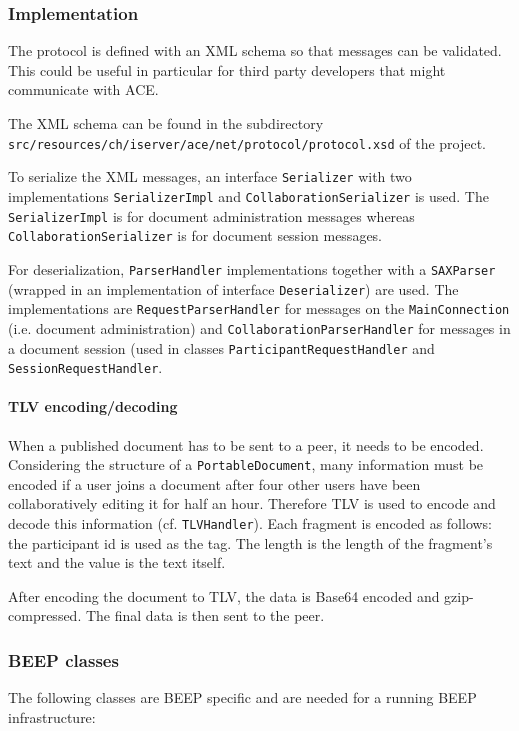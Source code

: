 \subsubsection{Implementation}
The protocol is defined with an XML schema so that messages can be validated. This could be useful in particular for third party developers that might communicate with ACE.

The XML schema can be found in the subdirectory \texttt{src/\-resources/\-ch/\-iserver/\-ace/\-net/\-protocol/\-protocol.xsd} of the project.

To serialize the XML messages, an interface \texttt{Serializer} with two implementations \texttt{SerializerImpl} and \texttt{CollaborationSerializer} is used. The \texttt{SerializerImpl} is for document administration messages whereas \texttt{CollaborationSerializer} is for document session messages.

For deserialization, \texttt{ParserHandler} implementations together with a \texttt{SAXParser} (wrapped in an implementation of interface \texttt{Deserializer}) are used. The implementations are \texttt{RequestParserHandler} for messages on the \texttt{MainConnection} (i.e. document administration) and \texttt{CollaborationParserHandler} for messages in a document session (used in classes \texttt{ParticipantRequestHandler} and \texttt{SessionRequestHandler}.


\paragraph{TLV encoding/decoding}
When a published document has to be sent to a peer, it needs to be encoded. Considering the structure of a \texttt{PortableDocument}, many information must be encoded if a user joins a document after four other users have been collaboratively editing it for half an hour. Therefore TLV is used to encode and decode this information (cf. \texttt{TLVHandler}). Each fragment is encoded as follows: the participant id is used as the tag. The length is the length of the fragment's text and the value is the text itself. 

After encoding the document to TLV, the data is Base64 encoded and gzip-compressed. The final data is then sent to the peer.


\subsubsection{BEEP classes}
The following classes are BEEP specific and are needed for a running BEEP infrastructure:


